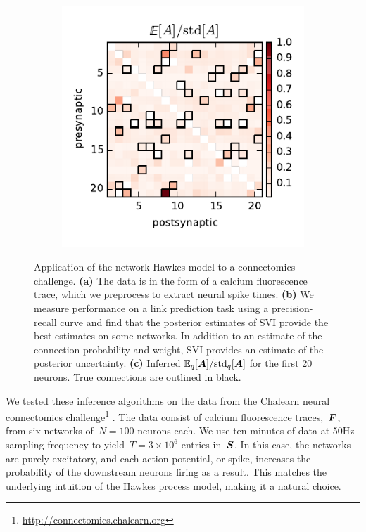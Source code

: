 \begin{figure}[t!]
\begin{center}
\begin{subfigure}[b]{0.32\linewidth}
      \label{fig:connectomics_prc}
    \end{subfigure}
    ~
    \begin{subfigure}[b]{0.32\linewidth}
      \caption{}
      \centering
      \includegraphics[width=\textwidth]{figures/ch4/chalearn_confidence.pdf} 
      \label{fig:connectomics_zscore}
    \end{subfigure}
    \caption[Discrete time Hawkes process applied to connectomics challenge]{
      Application of the network Hawkes model to a connectomics challenge.
      \textbf{(a)} The data is in the form of a calcium fluorescence trace, which we preprocess to extract neural spike times.
      \textbf{(b)} We measure performance on a link prediction task using a precision-recall curve and find that the posterior estimates of SVI provide the best estimates on some networks. In addition to an estimate of the connection probability and weight, SVI provides an estimate of the posterior uncertainty.
      \textbf{(c)} Inferred $\mathbb{E}_q[\boldsymbol{A}] / \text{std}_q[\boldsymbol{A}]$ for the first 20 neurons. True connections are outlined in black.}
    \label{fig:connectomics}
  \end{center}
\end{figure}

We tested these inference algorithms on the data from the Chalearn
neural connectomics
challenge\footnote{\url{http://connectomics.chalearn.org}}
\citep{Stetter-2012}.  The data consist of calcium fluorescence
traces,~$\boldsymbol{F}$, from six networks of~$N=100$ neurons each. We use ten
minutes of data at 50Hz sampling frequency to yield~$T=3\times 10^6$
entries in~$\boldsymbol{S}$.  In this case, the networks are purely excitatory,
and each action potential, or spike, increases the probability of the
downstream neurons firing as a result.  This matches the underlying
intuition of the Hawkes process model, making it a natural choice.

